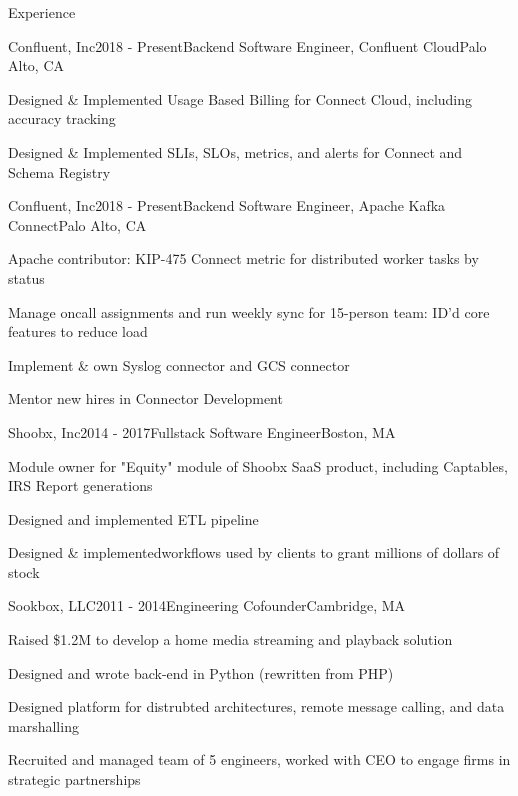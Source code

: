 \documentclass{resume}
\begin{document}

\begin{rSection}{Experience}

\begin{rSubsection}{Confluent, Inc}{2018 - Present}{Backend Software Engineer, Confluent Cloud}{Palo Alto, CA}
\item Designed \& Implemented Usage Based Billing for Connect Cloud, including accuracy tracking
\item Designed \& Implemented SLIs, SLOs, metrics, and alerts for Connect and Schema Registry
\end{rSubsection}

\begin{rSubsection}{Confluent, Inc}{2018 - Present}{Backend Software Engineer, Apache Kafka Connect}{Palo Alto, CA}
\item Apache contributor: KIP-475 Connect metric for distributed worker tasks by status
\item Manage oncall assignments and run weekly sync for 15-person team: ID'd core features to reduce load
\item Implement \& own Syslog connector and GCS connector
\item Mentor new hires in Connector Development
\end{rSubsection}

\begin{rSubsection}{Shoobx, Inc}{2014 - 2017}{Fullstack Software Engineer}{Boston, MA}
\item Module owner for "Equity" module of Shoobx SaaS product, including Captables, IRS Report generations
\item Designed and implemented ETL pipeline
\item Designed \& implementedworkflows used by clients to grant millions of dollars of stock
\end{rSubsection}

\begin{rSubsection}{Sookbox, LLC}{2011 - 2014}{Engineering Cofounder}{Cambridge, MA}
\item Raised \$1.2M to develop a home media streaming and playback solution
\item Designed and wrote back-end in Python (rewritten from PHP)
\item Designed platform for distrubted architectures, remote message calling, and data marshalling
\item Recruited and managed team of 5 engineers, worked with CEO to engage firms in strategic partnerships
\end{rSubsection}


\end{rSection}
\end{document}
